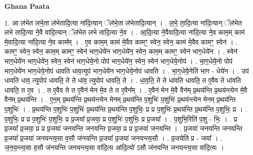 \documentclass[17pt]{extarticle}
\begin{document}
\textbf{Ghana Paata } \newline

1. आ ल॑भेत लभे॒ता ल॑भेतादि॒त्या ना॑दि॒त्यान् ॅल॑भे॒ता ल॑भेतादि॒त्यान् । . ल॒भे॒ ता॒दि॒त्या ना॑दि॒त्यान् ॅल॑भेत लभे तादि॒त्या ने॒वै वादि॒त्यान् ॅल॑भेत लभे तादि॒त्या ने॒व । . आ॒दि॒त्या ने॒वैवादि॒त्या ना॑दि॒त्या ने॒व काम॒म् काम॑ मे॒वादि॒त्या ना॑दि॒त्या ने॒व काम᳚म् । . ए॒व काम॒म् काम॑ मे॒वैव कामꣳ॒॒ स्वेन॒ स्वेन॒ काम॑ मे॒वैव कामꣳ॒॒ स्वेन॑ । . कामꣳ॒॒ स्वेन॒ स्वेन॒ काम॒म् कामꣳ॒॒ स्वेन॑ भाग॒धेये॑न भाग॒धेये॑न॒ स्वेन॒ काम॒म् कामꣳ॒॒ स्वेन॑ भाग॒धेये॑न । . स्वेन॑ भाग॒धेये॑न भाग॒धेये॑न॒ स्वेन॒ स्वेन॑ भाग॒धेये॒नो पोप॑ भाग॒धेये॑न॒ स्वेन॒ स्वेन॑ भाग॒धेये॒नोप॑ । . भा॒ग॒धेये॒नो पोप॑ भाग॒धेये॑न भाग॒धेये॒नोप॑ धावति धाव॒त्युप॑ भाग॒धेये॑न भाग॒धेये॒नोप॑ धावति । . भा॒ग॒धेये॒नेति॑ भाग - धेये॑न । . उप॑ धावति धाव॒ त्युपोप॑ धावति॒ ते ते धा॑व॒ त्युपोप॑ धावति॒ ते । . धा॒व॒ति॒ ते ते धा॑वति धावति॒ त ए॒वैव ते धा॑वति धावति॒ त ए॒व । . त ए॒वैव ते त ए॒वैन॑ मेन मे॒व ते त ए॒वैन᳚म् । . ए॒वैन॑ मेन मे॒वै वैन॑म् प्र॒थय॑न्ति प्र॒थय॑न्त्येन मे॒वै वैन॑म् प्र॒थय॑न्ति । . ए॒न॒म् प्र॒थय॑न्ति प्र॒थय॑न्त्येन मेनम् प्र॒थय॑न्ति प॒शुभिः॑ प॒शुभिः॑ प्र॒थय॑न्त्येन मेनम् प्र॒थय॑न्ति प॒शुभिः॑ । . प्र॒थय॑न्ति प॒शुभिः॑ प॒शुभिः॑ प्र॒थय॑न्ति प्र॒थय॑न्ति प॒शुभिः॒ प्र प्र प॒शुभिः॑ प्र॒थय॑न्ति प्र॒थय॑न्ति प॒शुभिः॒ प्र । . प॒शुभिः॒ प्र प्र प॒शुभिः॑ प॒शुभिः॒ प्र प्र॒जया᳚ प्र॒जया॒ प्र प॒शुभिः॑ प॒शुभिः॒ प्र प्र॒जया᳚ । . प॒शुभि॒रिति॑ प॒शु - भिः॒ । . प्र प्र॒जया᳚ प्र॒जया॒ प्र प्र प्र॒जया॑ जनयन्ति जनयन्ति प्र॒जया॒ प्र प्र प्र॒जया॑ जनयन्ति । . प्र॒जया॑ जनयन्ति जनयन्ति प्र॒जया᳚ प्र॒जया॑ जनयन्त्य॒सा व॒सौ ज॑नयन्ति प्र॒जया᳚ प्र॒जया॑ जनयन्त्य॒सौ । . प्र॒जयेति॑ प्र - जया᳚ । . ज॒न॒य॒न्त्य॒सा व॒सौ ज॑नयन्ति जनयन्त्य॒सा वा॑दि॒त्य आ॑दि॒त्यो॑ ऽसौ ज॑नयन्ति जनयन्त्य॒सा वा॑दि॒त्यः । \newline
\end{document}
